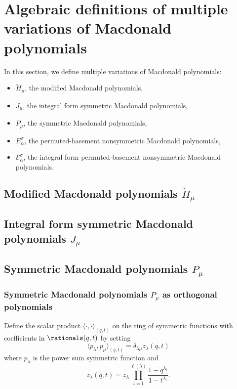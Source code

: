 \section{Algebraic definitions of multiple variations of Macdonald polynomials}

In this section, we define multiple variations of Macdonald polynomials:
\begin{itemize}
    \item \(\tilde{H}_\mu\), the modified Macdonald polynomials,
    \item \(J_\mu\), the integral form symmetric Macdonald polynomials,
    \item \(P_\mu\), the symmetric Macdonald polynomials,
    \item \(E_\alpha^\sigma\), the permuted-basement nonsymmetric Macdonald polynomials,
    \item \(\mathcal{E}_\alpha^\sigma\), the integral form permuted-basement nonsymmetric Macdonald polynomials.
\end{itemize}

\subsection{Modified Macdonald polynomials \texorpdfstring{\(\tilde{H}_\mu\)}{H̃μ}}

\subsection{Integral form symmetric Macdonald polynomials \texorpdfstring{\(J_\mu\)}{Jμ}}

\subsection{Symmetric Macdonald polynomials \texorpdfstring{\(P_\mu\)}{Pμ}}

\subsubsection{Symmetric Macdonald polynomials \texorpdfstring{\(P_\mu\)}{Pμ} as orthogonal polynomials}

\cite{Mac88} 

Define the scalar product \(\langle \cdot, \cdot \rangle_{(q, t)}\) on the ring of symmetric functions with coefficients in \(\rationals(q, t)\) by setting
\begin{equation}
\langle p_\lambda, p_\mu \rangle_{(q, t)} = \delta_{\lambda\mu} z_\lambda(q, t)
\end{equation}
where \(p_\lambda\) is the power sum symmetric function and
\begin{equation}
z_\lambda(q, t) = z_\lambda \prod_{i=1}^{\ell(\lambda)} \frac{1 - q^{\lambda_i}}{1 - t^{\lambda_i}}.
\end{equation}

